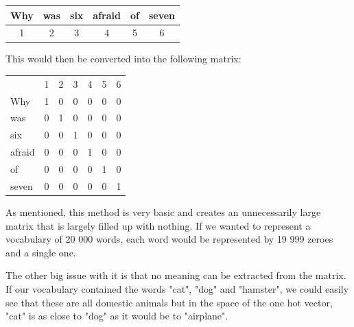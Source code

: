 \documentclass[nofilelist]{cslthse-msc}
\begin{document}
\begin{center}
    \begin{tabular}{c|c|c|c|c|c}
    
         Why & was & six & afraid & of & seven \\
         \hline
         1 & 2 & 3 & 4 & 5 & 6 \\
    \end{tabular}
\end{center}

This would then be converted into the following matrix:

\begin{center}
    \begin{tabular}{lllllll}
                            & 1 & 2 & 3 & 4 & 5 & 6 \\ \cline{2-7} 
\multicolumn{1}{l|}{Why}    & 1 & 0 & 0 & 0 & 0 & 0 \\
\multicolumn{1}{l|}{was}    & 0 & 1 & 0 & 0 & 0 & 0 \\
\multicolumn{1}{l|}{six}    & 0 & 0 & 1 & 0 & 0 & 0 \\
\multicolumn{1}{l|}{afraid} & 0 & 0 & 0 & 1 & 0 & 0 \\
\multicolumn{1}{l|}{of}     & 0 & 0 & 0 & 0 & 1 & 0 \\
\multicolumn{1}{l|}{seven}  & 0 & 0 & 0 & 0 & 0 & 1
    \end{tabular}
\end{center}

As mentioned, this method is very basic and creates an unnecessarily large matrix that is largely filled up with nothing. If we wanted to represent a vocabulary of 20 000 words, each word would be represented by 19 999 zeroes and a single one. 

The other big issue with it is that no meaning can be extracted from the matrix. If our vocabulary contained the words "cat", "dog" and "hamster", we could easily see that these are all domestic animals but in the space of the one hot vector, "cat" is as close to "dog" as it would be to "airplane". 
\end{document}
